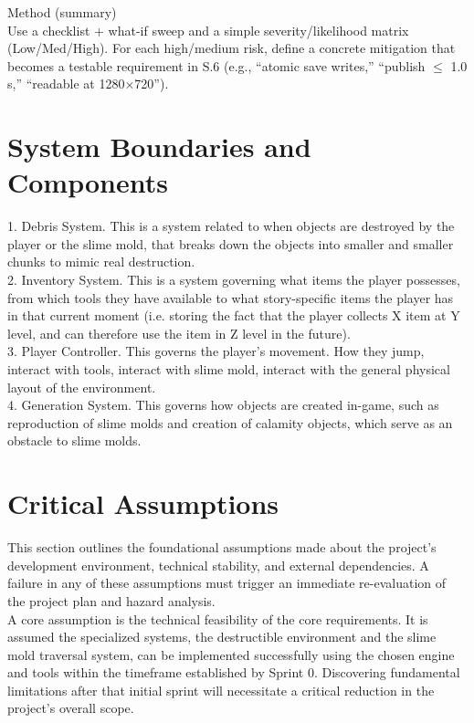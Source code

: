 \documentclass{article}
\begin{document}
Method (summary)\\
Use a checklist + what-if sweep and a simple severity/likelihood matrix (Low/Med/High). For each high/medium risk, define a concrete mitigation that becomes a testable requirement in S.6 (e.g., “atomic save writes,” “publish $\leq$ 1.0 s,” “readable at 1280×720”). \\

\section{System Boundaries and Components}

1. Debris System. This is a system related to when objects are destroyed by the player or the slime mold, that breaks down the objects into smaller and smaller chunks to mimic real destruction.\\
2. Inventory System. This is a system governing what items the player possesses, from which tools they have available to what story-specific items the player has in that current moment (i.e. storing the fact that the player collects X item at Y level, and can therefore use the item in Z level in the future).\\
3. Player Controller. This governs the player's movement. How they jump, interact with tools, interact with slime mold, interact with the general physical layout of the environment.\\
4. Generation System. This governs how objects are created in-game, such as reproduction of slime molds and creation of calamity objects, which serve as an obstacle to slime molds.\\

\section{Critical Assumptions}

This section outlines the foundational assumptions made about the project's development environment, technical stability, and external dependencies. A failure in any of these assumptions must trigger an immediate re-evaluation of the project plan and hazard analysis.\\

A core assumption is the technical feasibility of the core requirements. It is assumed the specialized systems, the destructible environment and the slime mold traversal system, can be implemented successfully using the chosen engine and tools within the timeframe established by Sprint 0. Discovering fundamental limitations after that initial sprint will necessitate a critical reduction in the project's overall scope.\\
\end{document}
